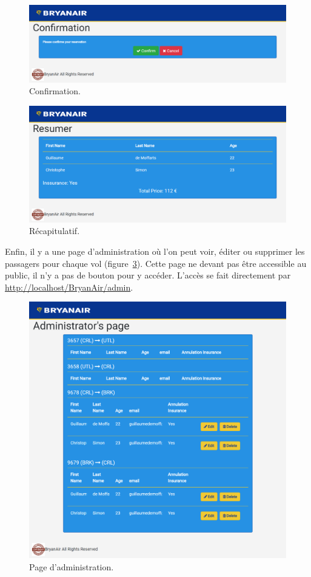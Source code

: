 \documentclass[12pt,a4paper]{article}
\begin{document}
		\begin{figure}[!p]
      \includegraphics[width=\textwidth]{Confirmation.png}
			\caption{Confirmation.}
			\label{fig:conf}
		\end{figure}

		\begin{figure}[!p]
      \includegraphics[width=\textwidth]{Resumer.png}
			\caption{Récapitulatif.}
			\label{fig:recap}
		\end{figure}

		Enfin, il y a une page d'administration où l'on peut voir, éditer ou supprimer les passagers pour chaque vol (figure~\ref{fig:admin}). Cette page ne devant pas être accessible au public, il n'y a pas de bouton pour y accéder. L'accès se fait directement par \url{http://localhost/BryanAir/admin}.

		\begin{figure}[!p]
      \includegraphics[width=\textwidth]{Admin.png}
			\caption{Page d'administration.}
			\label{fig:admin}
		\end{figure}
\end{document}

